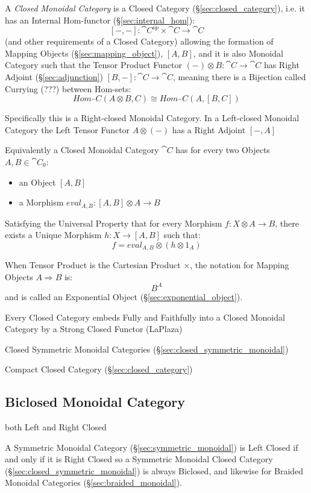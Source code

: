 A \emph{Closed Monoidal Category} is a Closed Category
(\S\ref{sec:closed_category}), i.e. it has an Internal Hom-functor
(\S\ref{sec:internal_hom}):
\[
  [-,-] : \cat{C}^{op} \times \cat{C} \rightarrow \cat{C}
\]
(and other requirements of a Closed Category) allowing the formation
of Mapping Objects (\S\ref{sec:mapping_object}), $[A,B]$,
and it is also Monoidal Category such that the Tensor Product Functor
$(-) \otimes B : \cat{C} \rightarrow \cat{C}$ has Right Adjoint
(\S\ref{sec:adjunction}) $[B,-] : \cat{C} \rightarrow \cat{C}$,
meaning there is a Bijection called Currying (???) between Hom-sets:
\[
  Hom_\cat{C}(A \otimes B,C) \cong Hom_\cat{C}(A, [B,C])
\]

Specifically this is a Right-closed Monoidal Category. In a
Left-closed Monoidal Category the Left Tensor Functor $A \otimes (-)$
has a Right Adjoint $[-,A]$

Equivalently a Closed Monoidal Category $\cat{C}$ has for every two
Objects $A,B \in \cat{C}_0$:
\begin{itemize}
  \item an Object $[A,B]$
  \item a Morphism $eval_{A,B} : [A,B] \otimes A \rightarrow B$
\end{itemize}
Satisfying the Universal Property that for every Morphism $f : X
\otimes A \rightarrow B$, there exists a Unique Morphism $h : X
\rightarrow [A,B]$ such that:
\[
  f = eval_{A,B} \otimes (h \otimes 1_A)
\]

When Tensor Product is the Cartesian Product $\times$, the notation
for Mapping Objects $A \Rightarrow B$ is:
\[
  B^A
\]
and is called an Exponential Object (\S\ref{sec:exponential_object}).

Every Closed Category embeds Fully and Faithfully into a Closed
Monoidal Category by a Strong Closed Functor (LaPlaza)

Closed Symmetric Monoidal Categories
(\S\ref{sec:closed_symmetric_monoidal})

Compact Closed Category (\S\ref{sec:closed_category})



\subsection{Biclosed Monoidal Category}\label{sec:biclosed_monoidal}

both Left and Right Closed

A Symmetric Monoidal Category (\S\ref{sec:symmetric_monoidal}) is Left
Closed if and only if it is Right Closed so a Symmetric Monoidal
Closed Category (\S\ref{sec:closed_symmetric_monoidal}) is always
Biclosed, and likewise for Braided Monoidal Categories
(\S\ref{sec:braided_monoidal}).



